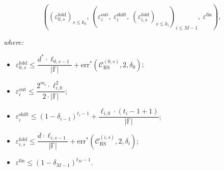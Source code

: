 \begin{theorem}
    \[
((\varepsilon_{0,s}^{\mathrm{fold}})_{s \leq k_0},\ (\varepsilon_i^{\mathrm{out}},\ \varepsilon_i^{\mathrm{shift}},\ (\varepsilon_{i,s}^{\mathrm{fold}})_{s \leq k_i})_{i \leq M-1},\ \varepsilon^{\mathrm{fin}}),
\]

\textit{where:}

\begin{itemize}
    \item $\varepsilon_{0,s}^{\mathrm{fold}} \leq \dfrac{d^* \cdot \ell_{0,s-1}}{|\mathbb{F}|} + \mathrm{err}^*(\mathcal{C}_{\mathrm{RS}}^{(0,s)}, 2, \delta_0)$;
    \item $\varepsilon_i^{\mathrm{out}} \leq \dfrac{2^{m_i} \cdot \ell_{i,0}^2}{2 \cdot |\mathbb{F}|}$;
    \item $\varepsilon_i^{\mathrm{shift}} \leq (1 - \delta_{i-1})^{t_i - 1} + \dfrac{\ell_{i,0} \cdot (t_i - 1 + 1)}{|\mathbb{F}|}$;
    \item $\varepsilon_{i,s}^{\mathrm{fold}} \leq \dfrac{d \cdot \ell_{i,s-1}}{|\mathbb{F}|} + \mathrm{err}^*(\mathcal{C}_{\mathrm{RS}}^{(i,s)}, 2, \delta_i)$;
    \item $\varepsilon^{\mathrm{fin}} \leq (1 - \delta_{M-1})^{t_M - 1}$.
\end{itemize}
\end{theorem}


